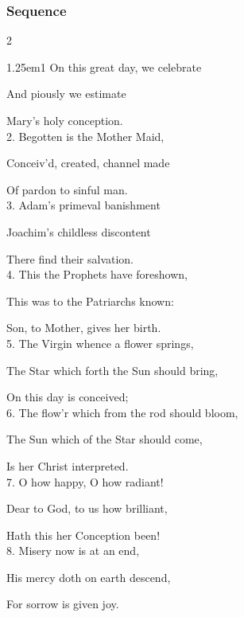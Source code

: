 \clearpage
\subsubsection{Sequence}

\vspace{-1\baselineskip}

\begin{multicols}{2}
\begin{hangparas}{1.25em}{1}
On this great day, we celebrate

And piously we estimate

Mary's holy conception.\\

2. Begotten is the Mother Maid,

Conceiv'd, created, channel made

Of pardon to sinful man.\\

3. Adam's primeval banishment

Joachim's childless discontent

There find their salvation.\\

4. This the Prophets have foreshown,

This was to the Patriarchs known:

Son, to Mother, gives her birth.\\

5. The Virgin whence a flower springs,

The Star which forth the Sun should bring,

On this day is conceived;\\

6. The flow'r which from the rod should bloom,

The Sun which of the Star should come,

Is her Christ interpreted.\\

7. O how happy, O how radiant!

Dear to God, to us how brilliant,

Hath this her Conception been!\\

8. Misery now is at an end,

His mercy doth on earth descend,

For sorrow is given joy.\\


\end{hangparas}
\end{multicols}
